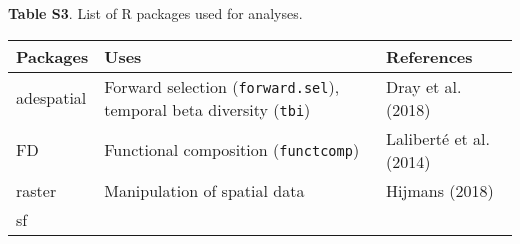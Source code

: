 \documentclass[
]{article}
\begin{document}
\pagebreak

\textbf{Table S3}. List of R packages used for analyses.

\begin{longtable}[]{@{}lll@{}}
\toprule
\begin{minipage}[b]{0.15\columnwidth}\raggedright
Packages\strut
\end{minipage} & \begin{minipage}[b]{0.48\columnwidth}\raggedright
Uses\strut
\end{minipage} & \begin{minipage}[b]{0.29\columnwidth}\raggedright
References\strut
\end{minipage}\tabularnewline
\midrule
\endhead
\begin{minipage}[t]{0.15\columnwidth}\raggedright
adespatial\strut
\end{minipage} & \begin{minipage}[t]{0.48\columnwidth}\raggedright
Forward selection (\texttt{forward.sel}), temporal beta diversity
(\texttt{tbi})\strut
\end{minipage} & \begin{minipage}[t]{0.29\columnwidth}\raggedright
Dray et al. (2018)\strut
\end{minipage}\tabularnewline
\begin{minipage}[t]{0.15\columnwidth}\raggedright
FD\strut
\end{minipage} & \begin{minipage}[t]{0.48\columnwidth}\raggedright
Functional composition (\texttt{functcomp})\strut
\end{minipage} & \begin{minipage}[t]{0.29\columnwidth}\raggedright
Laliberté et al. (2014)\strut
\end{minipage}\tabularnewline
\begin{minipage}[t]{0.15\columnwidth}\raggedright
raster\strut
\end{minipage} & \begin{minipage}[t]{0.48\columnwidth}\raggedright
Manipulation of spatial data\strut
\end{minipage} & \begin{minipage}[t]{0.29\columnwidth}\raggedright
Hijmans (2018)\strut
\end{minipage}\tabularnewline
\begin{minipage}[t]{0.15\columnwidth}\raggedright
sf\strut
\end{minipage} & \begin{minipage}[t]{0.48\columnwidth}\raggedright

\end{minipage}
\end{longtable}
\end{document}
